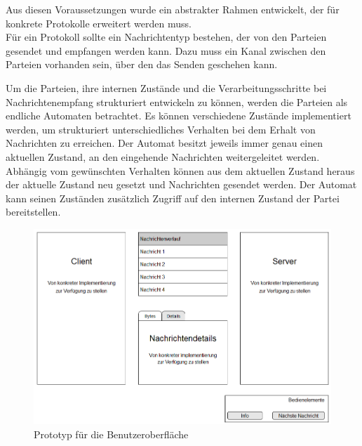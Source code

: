 Aus diesen Voraussetzungen wurde ein abstrakter Rahmen entwickelt, der für konkrete Protokolle erweitert werden muss.\\
Für ein Protokoll sollte ein Nachrichtentyp bestehen, der von den Parteien gesendet und empfangen werden kann. Dazu muss ein Kanal zwischen den Parteien vorhanden sein, über den das Senden geschehen kann.

Um die Parteien, ihre internen Zustände und die Verarbeitungsschritte bei Nachrichtenempfang strukturiert entwickeln zu können, werden die Parteien als endliche Automaten betrachtet. Es können verschiedene Zustände implementiert werden, um strukturiert unterschiedliches Verhalten bei dem Erhalt von Nachrichten zu erreichen. Der Automat besitzt jeweils immer genau einen aktuellen Zustand, an den eingehende Nachrichten weitergeleitet werden. Abhängig vom gewünschten Verhalten können aus dem aktuellen Zustand heraus der aktuelle Zustand neu gesetzt und Nachrichten gesendet werden. Der Automat kann seinen Zuständen zusätzlich Zugriff auf den internen Zustand der Partei bereitstellen.

\begin{figure}
	\centering
	\includegraphics[width=15cm]{Diagrams/SketchUI.png} %
	\caption{Prototyp für die Benutzeroberfläche}
	\label{fig_ui_sketch}
\end{figure}

